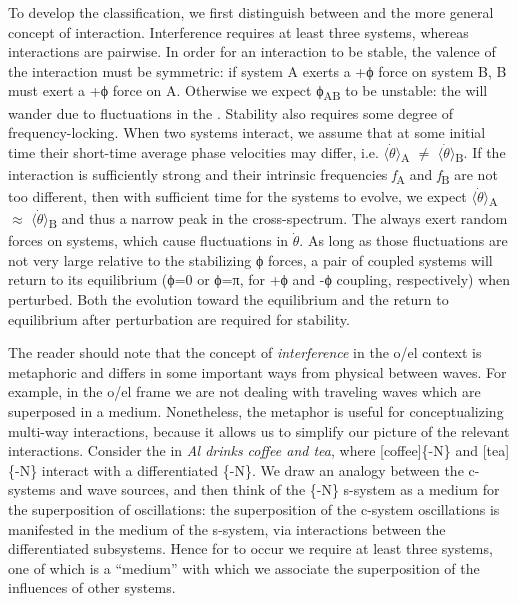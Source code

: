   To develop the classification, we first distinguish between  and the more general concept of interaction. Interference requires at least three systems, whereas interactions are pairwise. In order for an interaction to be stable, the valence of the interaction must be symmetric: if system A exerts a +ϕ force on system B, B must exert a +ϕ force on A. Otherwise we expect ϕ\textsubscript{AB} to be unstable: the  will wander due to fluctuations in the . Stability also requires some degree of frequency-locking. When two systems interact, we assume that at some initial time their short-time average phase velocities may differ, i.e. $\langle\dot{\theta}\rangle$\textsubscript{A} ${\neq}$ $\langle\dot{\theta}\rangle$\textsubscript{B}. If the interaction is sufficiently strong and their intrinsic frequencies \textit{f}\textsubscript{A} and \textit{f}\textsubscript{B} are not too different, then with sufficient time for the systems to evolve, we expect $\langle\dot{\theta}\rangle$\textsubscript{A} ${\approx}$ $\langle\dot{\theta}\rangle$\textsubscript{B} and thus a narrow peak in the cross-spectrum. The  always exert random forces on systems, which cause fluctuations in  $\dot{\theta}$. As long as those fluctuations are not very large relative to the stabilizing ϕ forces, a pair of coupled systems will return to its equilibrium (ϕ=0 or ϕ=π, for +ϕ and -ϕ coupling, respectively) when perturbed. Both the evolution toward the equilibrium and the return to equilibrium after perturbation are required for stability.

  The reader should note that the concept of \textit{interference} in the o/el context is metaphoric and differs in some important ways from physical  between waves. For example, in the o/el frame we are not dealing with traveling waves which are superposed in a medium. Nonetheless, the metaphor is useful for conceptualizing multi-way interactions, because it allows us to simplify our picture of the relevant interactions. Consider the  in \textit{Al drinks coffee and tea}, where [coffee]\{-N\} and [tea]\{-N\} interact with a differentiated \{-N\}. We draw an analogy between the c-systems and wave sources, and then think of the \{-N\} s-system as a medium for the superposition of oscillations: the superposition of the c-system oscillations is manifested in the medium of the s-system, via interactions between the differentiated subsystems. Hence for  to occur we require at least three systems, one of which is a “medium” with which we associate the superposition of the influences of other systems. 

